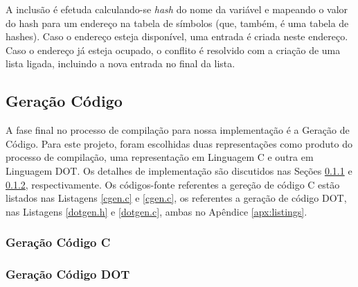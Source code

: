 A inclusão é efetuda calculando-se \emph{hash} do nome da variável e mapeando
o valor do hash para um endereço na tabela de símbolos (que, também, é uma
tabela de hashes). Caso o endereço esteja disponível, uma entrada é criada
neste endereço. Caso o endereço já esteja ocupado, o conflito é resolvido com
a criação de uma lista ligada, incluindo a nova entrada no final da lista.

\subsection{Geração Código}
\label{sec:gencode}

A fase final no processo de compilação para nossa implementação é a Geração de
Código. Para este projeto, foram escolhidas duas representações como produto
do processo de compilação, uma representação em Linguagem C e outra em
Linguagem DOT. Os detalhes de implementação são discutidos nas Seções
\ref{sec:gen_c} e \ref{sec:gen_dot}, respectivamente. Os códigos-fonte
referentes a gereção de código C estão listados nas Listagens \ref{cgen.c}
e \ref{cgen.c}, os referentes a geração de código DOT, nas Listagens
\ref{dotgen.h} e \ref{dotgen.c}, ambas no Apêndice \ref{apx:listings}.


\subsubsection{Geração Código C}
\label{sec:gen_c}

\subsubsection{Geração Código DOT}
\label{sec:gen_dot}

